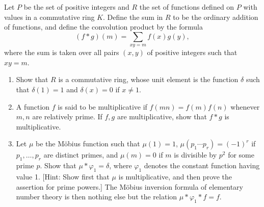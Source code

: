 \begin{problembox}
Let $P$ be the set of positive integers and $R$ the set of functions defined on $P$ with values in a commutative ring $K$. Define the sum in $R$ to be the ordinary addition of functions, and define the convolution product by the formula
\[ (f * g)(m) = \sum_{xy=m} f(x)g(y), \]
where the sum is taken over all pairs $(x, y)$ of positive integers such that $xy = m$.
\begin{enumerate}[label=(\alph*)]
    \item Show that $R$ is a commutative ring, whose unit element is the function $\delta$ such that $\delta(1) = 1$ and $\delta(x) = 0$ if $x \neq 1$.
    \item A function $f$ is said to be multiplicative if $f(mn) = f(m)f(n)$ whenever $m, n$ are relatively prime. If $f, g$ are multiplicative, show that $f * g$ is multiplicative.
    \item Let $\mu$ be the M\"obius function such that $\mu(1) = 1$, $\mu(p_1 \cdots p_r) = (-1)^r$ if $p_1, \ldots, p_r$ are distinct primes, and $\mu(m) = 0$ if $m$ is divisible by $p^2$ for some prime $p$. Show that $\mu * \varphi_1 = \delta$, where $\varphi_1$ denotes the constant function having value 1. [Hint: Show first that $\mu$ is multiplicative, and then prove the assertion for prime powers.] The M\"obius inversion formula of elementary number theory is then nothing else but the relation $\mu * \varphi_1 * f = f$.
\end{enumerate}
\end{problembox}

